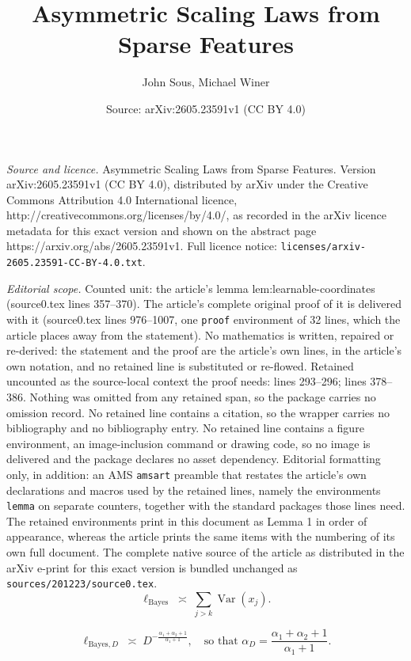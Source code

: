 \documentclass[10pt,a4paper]{amsart}
\title{Asymmetric Scaling Laws from Sparse Features}
\author{John Sous, Michael Winer}
\date{Source: arXiv:2605.23591v1 (CC BY 4.0)}
\begin{document}
\maketitle

\noindent\emph{Source and licence.} Asymmetric Scaling Laws from Sparse Features. Version arXiv:2605.23591v1 (CC BY 4.0), distributed by arXiv under the Creative Commons Attribution 4.0 International licence, http://creativecommons.org/licenses/by/4.0/, as recorded in the arXiv licence metadata for this exact version and shown on the abstract page https://arxiv.org/abs/2605.23591v1. Full licence notice: \texttt{licenses/arxiv-2605.23591-CC-BY-4.0.txt}.\par\smallskip

\noindent\textit{Editorial scope.} Counted unit: the article's lemma lem:learnable-coordinates (source0.tex lines 357--370). The article's complete original proof of it is delivered with it (source0.tex lines 976--1007, one \texttt{proof} environment of 32 lines, which the article places away from the statement). No mathematics is written, repaired or re-derived: the statement and the proof are the article's own lines, in the article's own notation, and no retained line is substituted or re-flowed.  Retained uncounted as the source-local context the proof needs: lines 293--296; lines 378--386.  Nothing was omitted from any retained span, so the package carries no omission record.  No retained line contains a citation, so the wrapper carries no bibliography and no bibliography entry.  No retained line contains a figure environment, an image-inclusion command or drawing code, so no image is delivered and the package declares no asset dependency.  Editorial formatting only, in addition: an AMS \texttt{amsart} preamble that restates the article's own declarations and macros used by the retained lines, namely the environments \texttt{lemma} on separate counters, together with the standard packages those lines need.  The retained environments print in this document as Lemma 1 in order of appearance, whereas the article prints the same items with the numbering of its own full document.  The complete native source of the article as distributed in the arXiv e-print for this exact version is bundled unchanged as \texttt{sources/201223/source0.tex}.
\begin{equation}
\ell_{\mathrm{Bayes}} \;\asymp\; \sum_{j>k} \operatorname{Var}(x_j).
\label{eq:bayes-tail}
\end{equation}

\begin{equation}
\ell_{\mathrm{Bayes},D}
\;\asymp\;
D^{-\frac{\alpha_1 + \alpha_2 + 1}{\alpha_1 + 1}},
\quad
\text{so that }
\alpha_D = \frac{\alpha_1 + \alpha_2 + 1}{\alpha_1 + 1}.
\label{eq:bayes-loss-over}
\end{equation}
\end{document}
